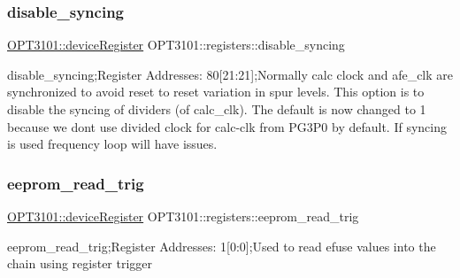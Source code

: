 \mbox{\label{class_o_p_t3101_1_1registers_ab57b1df98f5f15dd8027331041bfcfa3}} 
\subsubsection{\texorpdfstring{disable\+\_\+syncing}{disable\_syncing}}
{\footnotesize\ttfamily \mbox{\hyperlink{class_o_p_t3101_1_1device_register}{O\+P\+T3101\+::device\+Register}} O\+P\+T3101\+::registers\+::disable\+\_\+syncing}



disable\+\_\+syncing;Register Addresses\+: 80\mbox{[}21\+:21\mbox{]};Normally calc clock and afe\+\_\+clk are synchronized to avoid reset to reset variation in spur levels. This option is to disable the syncing of dividers (of calc\+\_\+clk). The default is now changed to \textquotesingle{}1\textquotesingle{} because we don\textquotesingle{}t use divided clock for calc-\/clk from P\+G3\+P0 by default. If syncing is used frequency loop will have issues. 

\mbox{\label{class_o_p_t3101_1_1registers_a881601f10b346c3724003a0721bd221a}} 
\subsubsection{\texorpdfstring{eeprom\+\_\+read\+\_\+trig}{eeprom\_read\_trig}}
{\footnotesize\ttfamily \mbox{\hyperlink{class_o_p_t3101_1_1device_register}{O\+P\+T3101\+::device\+Register}} O\+P\+T3101\+::registers\+::eeprom\+\_\+read\+\_\+trig}



eeprom\+\_\+read\+\_\+trig;Register Addresses\+: 1\mbox{[}0\+:0\mbox{]};Used to read efuse values into the chain using register trigger 

\mbox{\label{class_o_p_t3101_1_1registers_acc74ed36bdb89a844459ded9baea62c8}} 
